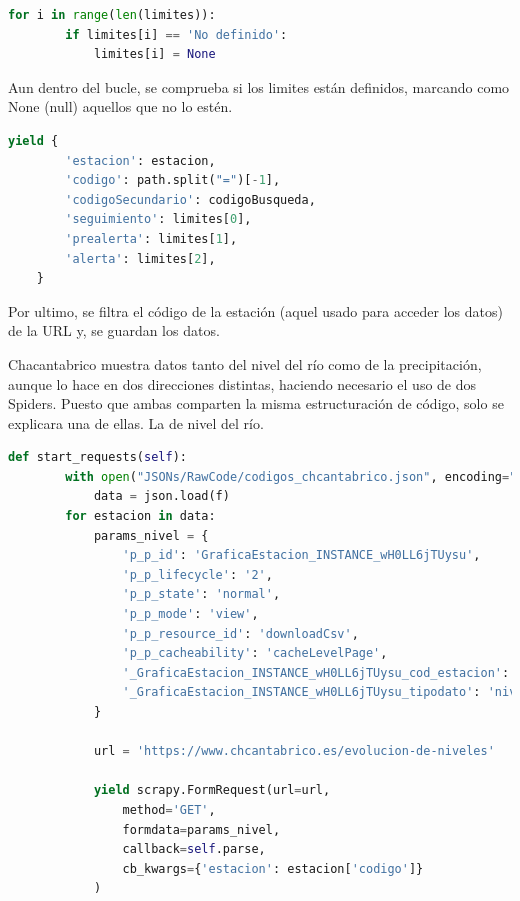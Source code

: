 \begin{lstlisting}[language=Python, caption={Combrobar limites de Chcantabrico Code Spider}]
	for i in range(len(limites)):
		if limites[i] == 'No definido':
			limites[i] = None
\end{lstlisting}

Aun dentro del bucle, se comprueba si los limites están definidos, marcando como None (null) aquellos que no lo estén.

\begin{lstlisting}[language=Python, caption={Guardado de datos de Chcantabrico Code Spider}]
	yield {
		'estacion': estacion,
		'codigo': path.split("=")[-1],
		'codigoSecundario': codigoBusqueda,
		'seguimiento': limites[0],
		'prealerta': limites[1],
		'alerta': limites[2],
	}
\end{lstlisting}

Por ultimo, se filtra el código de la estación (aquel usado para acceder los datos) de la URL y, se guardan los datos.

Chacantabrico muestra datos tanto del nivel del río como de la precipitación, aunque lo hace en dos direcciones distintas, haciendo necesario el uso de dos Spiders.\newline
\newline
Puesto que ambas comparten la misma estructuración de código, solo se explicara una de ellas. La de nivel del río.

\begin{lstlisting}[language=Python, caption={Función start\_requests() Chcantabrico Nivel Spider}]
	def start_requests(self):
		with open("JSONs/RawCode/codigos_chcantabrico.json", encoding="utf-8") as f:
			data = json.load(f)
		for estacion in data:
			params_nivel = {
				'p_p_id': 'GraficaEstacion_INSTANCE_wH0LL6jTUysu',
				'p_p_lifecycle': '2',
				'p_p_state': 'normal',
				'p_p_mode': 'view',
				'p_p_resource_id': 'downloadCsv',
				'p_p_cacheability': 'cacheLevelPage',
				'_GraficaEstacion_INSTANCE_wH0LL6jTUysu_cod_estacion': f'{estacion["codigo"]}',
				'_GraficaEstacion_INSTANCE_wH0LL6jTUysu_tipodato': 'nivel',
			}
		
			url = 'https://www.chcantabrico.es/evolucion-de-niveles'
			
			yield scrapy.FormRequest(url=url,
				method='GET',
				formdata=params_nivel,
				callback=self.parse,
				cb_kwargs={'estacion': estacion['codigo']}
			)
\end{lstlisting}

